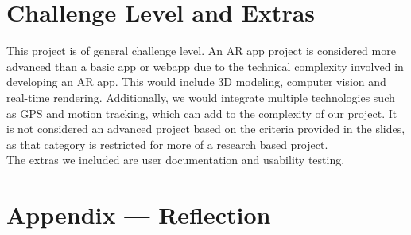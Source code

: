 \documentclass{article}
\begin{document}
\section{Challenge Level and Extras}

This project is of general challenge level. An AR app project is considered more advanced than a basic app or webapp due to the technical complexity involved in developing an AR app. This would include 3D modeling, computer vision and real-time rendering. Additionally, we would integrate multiple technologies such as GPS and motion tracking, which can add to the complexity of our project. It is not considered an advanced project based on the criteria provided in the slides, as that category is restricted for more of a research based project.\\

The extras we included are user documentation and usability testing.\\

\newpage{}

\section*{Appendix --- Reflection}


\end{document}
